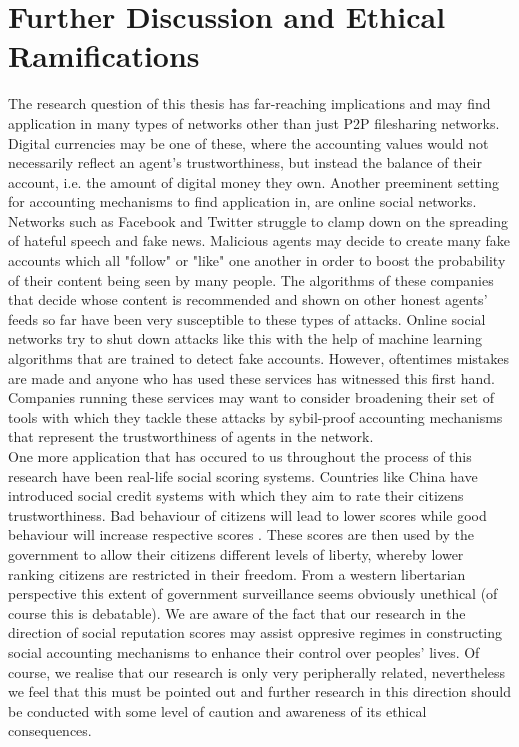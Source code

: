 \section{Further Discussion and Ethical Ramifications}
\label{sec:Further Discussion and Ethical Ramifications}
\noindent{}The research question of this thesis has far-reaching implications and may find application in many types of networks other than just P2P filesharing networks. Digital currencies may be one of these, where the accounting values would not necessarily reflect an agent's trustworthiness, but instead the balance of their account, i.e. the amount of digital money they own. Another preeminent setting for accounting mechanisms to find application in, are online social networks. Networks such as Facebook and Twitter struggle to clamp down on the spreading of hateful speech and fake news. Malicious agents may decide to create many fake accounts which all "follow" or "like" one another in order to boost the probability of their content being seen by many people. The algorithms of these companies that decide whose content is recommended and shown on other honest agents' feeds so far have been very susceptible to these types of attacks. Online social networks try to shut down attacks like this with the help of machine learning algorithms that are trained to detect fake accounts. However, oftentimes mistakes are made and anyone who has used these services has witnessed this first hand. Companies running these services may want to consider broadening their set of tools with which they tackle these attacks by sybil-proof accounting mechanisms that represent the trustworthiness of agents in the network. \vspace{1em}\\

\noindent{}One more application that has occured to us throughout the process of this research have been real-life social scoring systems. Countries like China have introduced social credit systems with which they aim to rate their citizens trustworthiness. Bad behaviour of citizens will lead to lower scores while good behaviour will increase respective scores \cite{Big Data Meets Big Brother as China Moves to Rate its Citizens}. These scores are then used by the government to allow their citizens different levels of liberty, whereby lower ranking citizens are restricted in their freedom. From a western libertarian perspective this extent of government surveillance seems obviously unethical (of course this is debatable). We are aware of the fact that our research in the direction of social reputation scores may assist oppresive regimes in constructing social accounting mechanisms to enhance their control over peoples' lives. Of course, we realise that our research is only very peripherally related, nevertheless we feel that this must be pointed out and further research in this direction should be conducted with some level of caution and awareness of its ethical consequences.\vspace{1em}\\

